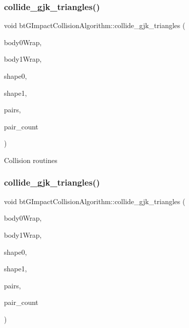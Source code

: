 \subsubsection{\texorpdfstring{collide\+\_\+gjk\+\_\+triangles()}{collide\_gjk\_triangles()}\hspace{0.1cm}{\footnotesize\ttfamily [1/2]}}
{\footnotesize\ttfamily void bt\+G\+Impact\+Collision\+Algorithm\+::collide\+\_\+gjk\+\_\+triangles (\begin{DoxyParamCaption}\item[{const \hyperlink{structbtCollisionObjectWrapper}{bt\+Collision\+Object\+Wrapper} $\ast$}]{body0\+Wrap,  }\item[{const \hyperlink{structbtCollisionObjectWrapper}{bt\+Collision\+Object\+Wrapper} $\ast$}]{body1\+Wrap,  }\item[{const \hyperlink{classbtGImpactMeshShapePart}{bt\+G\+Impact\+Mesh\+Shape\+Part} $\ast$}]{shape0,  }\item[{const \hyperlink{classbtGImpactMeshShapePart}{bt\+G\+Impact\+Mesh\+Shape\+Part} $\ast$}]{shape1,  }\item[{const int $\ast$}]{pairs,  }\item[{int}]{pair\+\_\+count }\end{DoxyParamCaption})\hspace{0.3cm}{\ttfamily [protected]}}

Collision routines \mbox{\label{classbtGImpactCollisionAlgorithm_a1cc907bcb394f7a95d609b1b56a5490e}} 
\subsubsection{\texorpdfstring{collide\+\_\+gjk\+\_\+triangles()}{collide\_gjk\_triangles()}\hspace{0.1cm}{\footnotesize\ttfamily [2/2]}}
{\footnotesize\ttfamily void bt\+G\+Impact\+Collision\+Algorithm\+::collide\+\_\+gjk\+\_\+triangles (\begin{DoxyParamCaption}\item[{const \hyperlink{structbtCollisionObjectWrapper}{bt\+Collision\+Object\+Wrapper} $\ast$}]{body0\+Wrap,  }\item[{const \hyperlink{structbtCollisionObjectWrapper}{bt\+Collision\+Object\+Wrapper} $\ast$}]{body1\+Wrap,  }\item[{const \hyperlink{classbtGImpactMeshShapePart}{bt\+G\+Impact\+Mesh\+Shape\+Part} $\ast$}]{shape0,  }\item[{const \hyperlink{classbtGImpactMeshShapePart}{bt\+G\+Impact\+Mesh\+Shape\+Part} $\ast$}]{shape1,  }\item[{const int $\ast$}]{pairs,  }\item[{int}]{pair\+\_\+count }\end{DoxyParamCaption})\hspace{0.3cm}{\ttfamily [protected]}}

